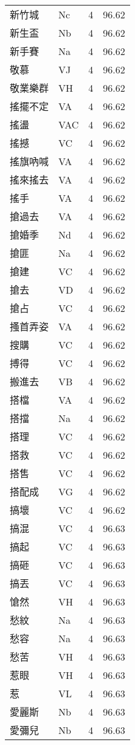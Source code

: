 \documentclass[twocolumn]{book}
\begin{document}
\begin{supertabular}{llrr}
新竹城 & Nc & 4 &  96.62\\
新生盃 & Nb & 4 &  96.62\\
新手賽 & Na & 4 &  96.62\\
敬慕 & VJ & 4 &  96.62\\
敬業樂群 & VH & 4 &  96.62\\
搖擺不定 & VA & 4 &  96.62\\
搖盪 & VAC & 4 &  96.62\\
搖撼 & VC & 4 &  96.62\\
搖旗吶喊 & VA & 4 &  96.62\\
搖來搖去 & VA & 4 &  96.62\\
搖手 & VA & 4 &  96.62\\
搶過去 & VA & 4 &  96.62\\
搶婚季 & Nd & 4 &  96.62\\
搶匪 & Na & 4 &  96.62\\
搶建 & VC & 4 &  96.62\\
搶去 & VD & 4 &  96.62\\
搶占 & VC & 4 &  96.62\\
搔首弄姿 & VA & 4 &  96.62\\
搜購 & VC & 4 &  96.62\\
搏得 & VC & 4 &  96.62\\
搬進去 & VB & 4 &  96.62\\
搭檔 & VA & 4 &  96.62\\
搭擋 & Na & 4 &  96.62\\
搭理 & VC & 4 &  96.62\\
搭救 & VC & 4 &  96.62\\
搭售 & VC & 4 &  96.62\\
搭配成 & VG & 4 &  96.62\\
搞壞 & VC & 4 &  96.62\\
搞混 & VC & 4 &  96.63\\
搞起 & VC & 4 &  96.63\\
搞砸 & VC & 4 &  96.63\\
搞丟 & VC & 4 &  96.63\\
愴然 & VH & 4 &  96.63\\
愁紋 & Na & 4 &  96.63\\
愁容 & Na & 4 &  96.63\\
愁苦 & VH & 4 &  96.63\\
惹眼 & VH & 4 &  96.63\\
惹 & VL & 4 &  96.63\\
愛麗斯 & Nb & 4 &  96.63\\
愛彌兒 & Nb & 4 &  96.63\\

\end{supertabular}
\end{document}
